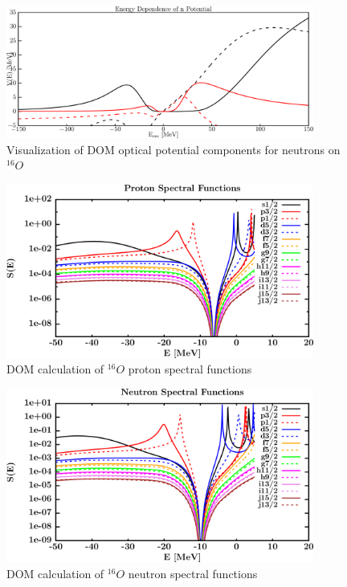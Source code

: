 \begin{figure}
\begin{center}
\includegraphics[width = 0.9\textwidth]{figures/o16_neutronPotentials.png}
\caption{Visualization of DOM optical potential components for neutrons on
$^{16}O$}
\label{o16NeutronPotentials}
\end{center}
\end{figure}

\begin{figure}
\begin{center}
\includegraphics[width = 0.9\textwidth]{figures/o16_protonSpectralFunctions.png}
\caption{DOM calculation of $^{16}O$ proton spectral functions}
\label{o16ProtonSpectralFunctions}
\end{center}
\end{figure}


\begin{figure}
\begin{center}
\includegraphics[width = 0.9\textwidth]{figures/o16_neutronSpectralFunctions.png}
\caption{DOM calculation of $^{16}O$ neutron spectral functions}
\label{o16NeutronSpectralFunctions}
\end{center}
\end{figure}


